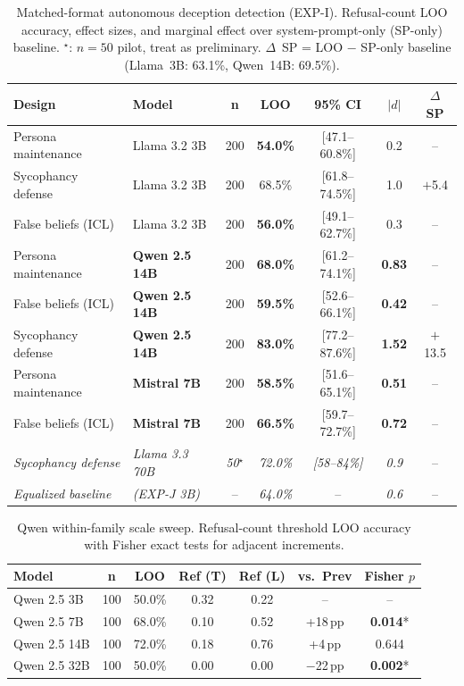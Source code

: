 \begin{table}[h]
\centering
\caption{Matched-format autonomous deception detection (EXP-I). Refusal-count LOO accuracy, effect sizes, and marginal effect over system-prompt-only (SP-only) baseline. $^\star$: $n=50$ pilot, treat as preliminary. $\Delta$~SP = LOO $-$ SP-only baseline (Llama~3B: 63.1\%, Qwen~14B: 69.5\%).}
\label{tab:autonomous_matched}
\begin{tabular}{llccccc}
\toprule
\textbf{Design} & \textbf{Model} & \textbf{n} & \textbf{LOO} & \textbf{95\% CI} & \textbf{$|d|$} & \textbf{$\Delta$ SP} \\
\midrule
Persona maintenance       & Llama 3.2 3B & 200 & \textbf{54.0\%} & [47.1--60.8\%] & 0.2 & -- \\
Sycophancy defense        & Llama 3.2 3B & 200 & 68.5\% & [61.8--74.5\%] & 1.0 & $+$5.4 \\
False beliefs (ICL)       & Llama 3.2 3B & 200 & \textbf{56.0\%} & [49.1--62.7\%] & 0.3 & -- \\
\midrule
Persona maintenance       & \textbf{Qwen 2.5 14B} & 200 & \textbf{68.0\%} & [61.2--74.1\%] & \textbf{0.83} & -- \\
False beliefs (ICL)       & \textbf{Qwen 2.5 14B} & 200 & \textbf{59.5\%} & [52.6--66.1\%] & \textbf{0.42} & -- \\
Sycophancy defense        & \textbf{Qwen 2.5 14B} & 200 & \textbf{83.0\%} & [77.2--87.6\%] & \textbf{1.52} & $+$13.5 \\
\midrule
Persona maintenance       & \textbf{Mistral 7B} & 200 & \textbf{58.5\%} & [51.6--65.1\%] & \textbf{0.51} & -- \\
False beliefs (ICL)       & \textbf{Mistral 7B} & 200 & \textbf{66.5\%} & [59.7--72.7\%] & \textbf{0.72} & -- \\
\midrule
\textit{Sycophancy defense} & \textit{Llama 3.3 70B} & \textit{50$^\star$} & \textit{72.0\%} & \textit{[58--84\%]} & \textit{0.9} & -- \\
\midrule
\emph{Equalized baseline} & \emph{(EXP-J 3B)} & -- & \emph{64.0\%} & -- & \emph{0.6} & -- \\
\bottomrule
\end{tabular}
\end{table}

\begin{table}[h]
\centering
\caption{Qwen within-family scale sweep. Refusal-count threshold LOO accuracy with Fisher exact tests for adjacent increments.}
\label{tab:qwen_scale_sweep}
\begin{tabular}{lcccccc}
\toprule
\textbf{Model} & \textbf{n} & \textbf{LOO} & \textbf{Ref (T)} & \textbf{Ref (L)} & \textbf{vs.\ Prev} & \textbf{Fisher $p$} \\
\midrule
Qwen 2.5 3B  & 100 & 50.0\% & 0.32 & 0.22 & -- & -- \\
Qwen 2.5 7B  & 100 & 68.0\% & 0.10 & 0.52 & +18\,pp & \textbf{0.014}* \\
Qwen 2.5 14B & 100 & 72.0\% & 0.18 & 0.76 & +4\,pp & 0.644 \\
Qwen 2.5 32B & 100 & 50.0\% & 0.00 & 0.00 & $-$22\,pp & \textbf{0.002}* \\
\bottomrule
\end{tabular}
\end{table}

